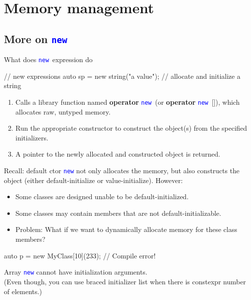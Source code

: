 \documentclass{beamer}
\newcommand{\blue}[1]{\textcolor{blue}{#1}}
\renewcommand{\bf}[1]{\textbf{#1}}
\newcommand{\ttt}[1]{\texttt{#1}}
\newcommand{\bluett}[1]{\blue{\ttt{#1}}}
\newcommand{\new}{\bluett{new}~}
\begin{document}
\section{Memory management}

\subsection{More on \new}

\begin{frame}[fragile]{What does \new expression do}
    \begin{cpp}
// new expressions
auto sp = new string("a value"); // allocate and initialize a string
    \end{cpp}
    \begin{enumerate}
        \item Calls a library function named \bf{operator} \new (or \bf{operator} \new []), which allocates raw, untyped memory.
        \item Run the appropriate constructor to construct the object(s) from
        the specified initializers.
        \item A pointer to the newly allocated and constructed object is returned.
    \end{enumerate}
\end{frame}

\begin{frame}[fragile]{Recall: default ctor}
    \bluett{new} not only allocates the memory, but also constructs the object (either default-initialize or value-initialize). However:
    \begin{itemize}
        \item     Some classes are designed unable to be default-initialized.
        \item Some classes may contain members that are not default-initializable.
        \item Problem: What if we want to dynamically allocate memory for these class members?
    \end{itemize}
    \begin{cpp}
        auto p = new MyClass[10](233); // Compile error!
    \end{cpp}
    Array \bluett{new} cannot have initialization arguments.\\
    (Even though, you can use braced initializer list when there is constexpr number of elements.)
\end{frame}
\end{document}

